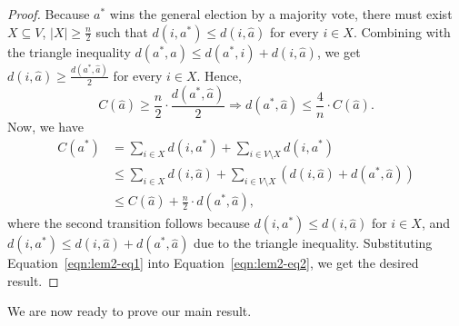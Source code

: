 \documentclass[letterpaper]{article} %
\theoremstyle{definition}
\renewcommand{\hat}{\widehat}
\begin{document}
\begin{proof}
Because $a^*$ wins the general election by a majority vote, there must exist $X \subseteq V$, $|X| \ge \frac{n}{2}$ such that $d(i,a^*) \le d(i,\hat{a})$ for every $i \in X$. Combining with the triangle inequality $d(a^*,\hat{a}) \le d(a^*,i) + d(i,\hat{a})$, we get $d(i,\hat{a}) \ge \frac{d(a^*,\hat{a})}{2}$ for every $i \in X$. Hence,
	\begin{equation}
	C(\hat{a}) \ge \frac{n}{2} \cdot \frac{d(a^*,\hat{a})}{2} \Rightarrow d(a^*,\hat{a}) \le \frac{4}{n} \cdot C(\hat{a}).
	\label{eqn:lem2-eq1}
	\end{equation}
\normalsize
	Now, we have
	\begin{align}
	C(a^*) &= \sum_{i \in X} d(i,a^*) + \sum_{i \in V \setminus X} d(i,a^*) \nonumber\\
	&\le \sum_{i \in X} d(i,\hat{a}) + \sum_{i \in V \setminus X} (d(i,\hat{a}) + d(a^*,\hat{a})) \nonumber\\
	&\le C(\hat{a}) + \frac{n}{2} \cdot d(a^*,\hat{a}),
	\label{eqn:lem2-eq2}
	\end{align}
	\normalsize
	where the second transition follows because $d(i,a^*) \le d(i,\hat{a})$ for $i \in X$, and $d(i,a^*) \le d(i,\hat{a})+d(a^*,\hat{a})$ due to the triangle inequality. Substituting Equation~\eqref{eqn:lem2-eq1} into Equation~\eqref{eqn:lem2-eq2}, we get the desired result.
\end{proof}
We are now ready to prove our main result.
\end{document}
